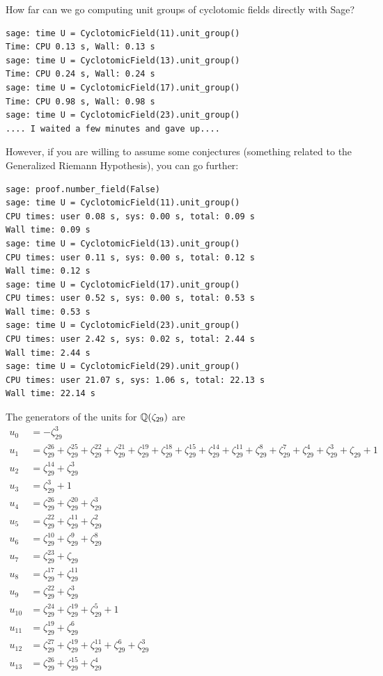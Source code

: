 How far can we go computing unit groups of cyclotomic fields
directly with Sage?
\begin{lstlisting}
sage: time U = CyclotomicField(11).unit_group()
Time: CPU 0.13 s, Wall: 0.13 s
sage: time U = CyclotomicField(13).unit_group()
Time: CPU 0.24 s, Wall: 0.24 s
sage: time U = CyclotomicField(17).unit_group()
Time: CPU 0.98 s, Wall: 0.98 s
sage: time U = CyclotomicField(23).unit_group()
.... I waited a few minutes and gave up....
\end{lstlisting}

However, if you are willing to assume some conjectures (something
related to the Generalized Riemann Hypothesis), you can go further:
\begin{lstlisting}
sage: proof.number_field(False)
sage: time U = CyclotomicField(11).unit_group()
CPU times: user 0.08 s, sys: 0.00 s, total: 0.09 s
Wall time: 0.09 s
sage: time U = CyclotomicField(13).unit_group()
CPU times: user 0.11 s, sys: 0.00 s, total: 0.12 s
Wall time: 0.12 s
sage: time U = CyclotomicField(17).unit_group()
CPU times: user 0.52 s, sys: 0.00 s, total: 0.53 s
Wall time: 0.53 s
sage: time U = CyclotomicField(23).unit_group()
CPU times: user 2.42 s, sys: 0.02 s, total: 2.44 s
Wall time: 2.44 s
sage: time U = CyclotomicField(29).unit_group()
CPU times: user 21.07 s, sys: 1.06 s, total: 22.13 s
Wall time: 22.14 s
\end{lstlisting}
The generators of the units for $\mathbb{Q}(\zeta_{29})$ are
\begin{align*}
u_{0} &= -\zeta_{29}^{3}\\
u_{1} &= \zeta_{29}^{26} + \zeta_{29}^{25} + \zeta_{29}^{22} + \zeta_{29}^{21} + \zeta_{29}^{19} + \zeta_{29}^{18} + \zeta_{29}^{15} + \zeta_{29}^{14} + \zeta_{29}^{11} + \zeta_{29}^{8} + \zeta_{29}^{7} + \zeta_{29}^{4} + \zeta_{29}^{3} + \zeta_{29} + 1\\
u_{2} &= \zeta_{29}^{14} + \zeta_{29}^{3}\\
u_{3} &= \zeta_{29}^{3} + 1\\
u_{4} &= \zeta_{29}^{26} + \zeta_{29}^{20} + \zeta_{29}^{3}\\
u_{5} &= \zeta_{29}^{22} + \zeta_{29}^{11} + \zeta_{29}^{2}\\
u_{6} &= \zeta_{29}^{10} + \zeta_{29}^{9} + \zeta_{29}^{8}\\
u_{7} &= \zeta_{29}^{23} + \zeta_{29}\\
u_{8} &= \zeta_{29}^{17} + \zeta_{29}^{11}\\
u_{9} &= \zeta_{29}^{22} + \zeta_{29}^{3}\\
u_{10} &= \zeta_{29}^{24} + \zeta_{29}^{19} + \zeta_{29}^{5} + 1\\
u_{11} &= \zeta_{29}^{19} + \zeta_{29}^{6}\\
u_{12} &= \zeta_{29}^{27} + \zeta_{29}^{19} + \zeta_{29}^{11} + \zeta_{29}^{6} + \zeta_{29}^{3}\\
u_{13} &= \zeta_{29}^{26} + \zeta_{29}^{15} + \zeta_{29}^{4}\\
\end{align*}

